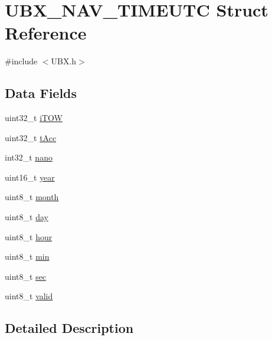 \hypertarget{struct_u_b_x___n_a_v___t_i_m_e_u_t_c}{\section{\-U\-B\-X\-\_\-\-N\-A\-V\-\_\-\-T\-I\-M\-E\-U\-T\-C \-Struct \-Reference}
\label{struct_u_b_x___n_a_v___t_i_m_e_u_t_c}
}


{\ttfamily \#include $<$\-U\-B\-X.\-h$>$}

\subsection*{\-Data \-Fields}
\begin{DoxyCompactItemize}
\item 
uint32\-\_\-t \hyperlink{struct_u_b_x___n_a_v___t_i_m_e_u_t_c_ad71c5daaee202e2453fd942712b931d8}{i\-T\-O\-W}
\item 
uint32\-\_\-t \hyperlink{struct_u_b_x___n_a_v___t_i_m_e_u_t_c_adb8a5ad986f11644415dc969c0803cc9}{t\-Acc}
\item 
int32\-\_\-t \hyperlink{struct_u_b_x___n_a_v___t_i_m_e_u_t_c_a2d187aede7b05688f29eacfd6bd57ecc}{nano}
\item 
uint16\-\_\-t \hyperlink{struct_u_b_x___n_a_v___t_i_m_e_u_t_c_a8ea81fa402795b3daf6ec8bcc9c51eb1}{year}
\item 
uint8\-\_\-t \hyperlink{struct_u_b_x___n_a_v___t_i_m_e_u_t_c_afd4af98336281bae2375714238392070}{month}
\item 
uint8\-\_\-t \hyperlink{struct_u_b_x___n_a_v___t_i_m_e_u_t_c_af47b128d3c65964f825c689849546c6d}{day}
\item 
uint8\-\_\-t \hyperlink{struct_u_b_x___n_a_v___t_i_m_e_u_t_c_a6685b128ba202f68bbba28ce3877d496}{hour}
\item 
uint8\-\_\-t \hyperlink{struct_u_b_x___n_a_v___t_i_m_e_u_t_c_acd6195ae28168d6d82b8944dd362a976}{min}
\item 
uint8\-\_\-t \hyperlink{struct_u_b_x___n_a_v___t_i_m_e_u_t_c_adf8744b17bc7095cc06d9f0909bd865d}{sec}
\item 
uint8\-\_\-t \hyperlink{struct_u_b_x___n_a_v___t_i_m_e_u_t_c_a7709acce4beceb6a24a8f239923fb026}{valid}
\end{DoxyCompactItemize}


\subsection{\-Detailed \-Description}


